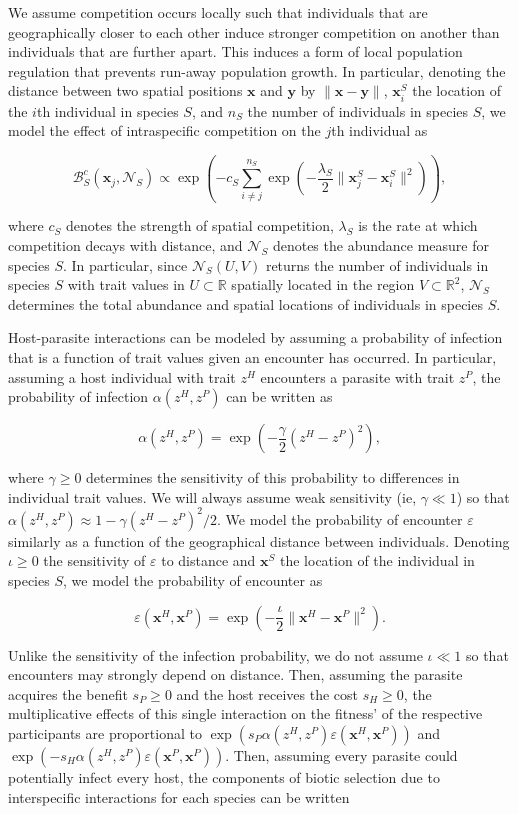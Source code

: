 \documentclass{article}
\begin{document}
We assume competition occurs locally such that individuals that are
geographically closer to each other induce stronger competition on
another than individuals that are further apart. This induces a form of
local population regulation that prevents run-away population growth. In
particular, denoting the distance between two spatial positions
\(\pmb x\) and \(\pmb y\) by \(\|\pmb x-\pmb y\|\), \(\pmb x_i^S\) the
location of the \(i\)th individual in species \(S\), and \(n_S\) the
number of individuals in species \(S\), we model the effect of
intraspecific competition on the \(j\)th individual as

\[\mathcal B_S^c(\pmb x_j,\mathcal N_S)\propto\exp\left(-c_S\sum_{i\neq j}^{n_S}\exp\left(-\frac{\lambda_S}{2}\|\pmb x_j^S-\pmb x_i^S\|^2\right)\right),\]

where \(c_S\) denotes the strength of spatial competition, \(\lambda_S\)
is the rate at which competition decays with distance, and
\(\mathcal N_S\) denotes the abundance measure for species \(S\). In
particular, since \(\mathcal N_S(U,V)\) returns the number of
individuals in species \(S\) with trait values in \(U\subset\mathbb R\)
spatially located in the region \(V\subset\mathbb R^2\),
\(\mathcal N_S\) determines the total abundance and spatial locations of
individuals in species \(S\).

Host-parasite interactions can be modeled by assuming a probability of
infection that is a function of trait values given an encounter has
occurred. In particular, assuming a host individual with trait \(z^H\)
encounters a parasite with trait \(z^P\), the probability of infection
\(\alpha(z^H,z^P)\) can be written as

\[\alpha(z^H,z^P)=\exp\left(-\frac{\gamma}{2}(z^H-z^P)^2\right),\]

where \(\gamma\geq0\) determines the sensitivity of this probability to
differences in individual trait values. We will always assume weak
sensitivity (ie, \(\gamma\ll1\)) so that
\(\alpha(z^H,z^P)\approx1-\gamma(z^H-z^P)^2/2\). We model the
probability of encounter \(\varepsilon\) similarly as a function of the
geographical distance between individuals. Denoting \(\iota\geq0\) the
sensitivity of \(\varepsilon\) to distance and \(\pmb x^S\) the location
of the individual in species \(S\), we model the probability of
encounter as

\[\varepsilon(\pmb x^H,\pmb x^P)=\exp\left(-\frac{\iota}{2}\|\pmb x^H-\pmb x^P\|^2\right).\]

Unlike the sensitivity of the infection probability, we do not assume
\(\iota\ll1\) so that encounters may strongly depend on distance. Then,
assuming the parasite acquires the benefit \(s_P\geq0\) and the host
receives the cost \(s_H\geq0\), the multiplicative effects of this
single interaction on the fitness' of the respective participants are
proportional to
\(\exp(s_P\alpha(z^H,z^P)\varepsilon(\pmb x^H,\pmb x^P))\) and
\(\exp(-s_H\alpha(z^H,z^P)\varepsilon(\pmb x^P,\pmb x^P))\). Then,
assuming every parasite could potentially infect every host, the
components of biotic selection due to interspecific interactions for
each species can be written
\end{document}
